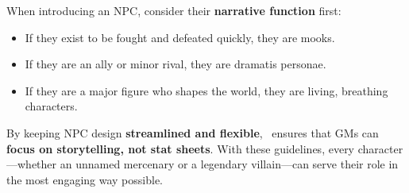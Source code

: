 When introducing an NPC, consider their \textbf{narrative function} first:
\begin{itemize}
    \item If they exist to be fought and defeated quickly, they are mooks.
    \item If they are an ally or minor rival, they are dramatis personae.
    \item If they are a major figure who shapes the world, they are living, breathing characters.
\end{itemize}

By keeping NPC design \textbf{streamlined and flexible}, \wyrd\ ensures that GMs can \textbf{focus on storytelling, not stat sheets}. With these guidelines, every character—whether an unnamed mercenary or a legendary villain—can serve their role in the most engaging way possible.

